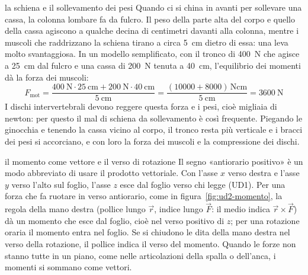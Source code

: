 

\begin{applicazione}{la schiena e il sollevamento dei pesi}
Quando ci si china in avanti per sollevare una cassa, la colonna lombare fa da fulcro. Il peso della parte alta del corpo e quello della cassa agiscono a qualche decina di centimetri davanti alla colonna, mentre i muscoli che raddrizzano la schiena tirano a circa \SI{5}{\centi\metre} dietro di essa: una leva molto svantaggiosa. In un modello semplificato, con il tronco di \SI{400}{\newton} che agisce a \SI{25}{\centi\metre} dal fulcro e una cassa di \SI{200}{\newton} tenuta a \SI{40}{\centi\metre}, l'equilibrio dei momenti dà la forza dei muscoli:
\[
  F_{\text{mot}} = \frac{\SI{400}{\newton} \cdot \SI{25}{\centi\metre} + \SI{200}{\newton} \cdot \SI{40}{\centi\metre}}{\SI{5}{\centi\metre}} = \frac{(10000 + 8000)\,\si{\newton\centi\metre}}{\SI{5}{\centi\metre}} = \SI{3600}{\newton}
\]
I dischi intervertebrali devono reggere questa forza e i pesi, cioè migliaia di newton: per questo il mal di schiena da sollevamento è così frequente. Piegando le ginocchia e tenendo la cassa vicino al corpo, il tronco resta più verticale e i bracci dei pesi si accorciano, e con loro la forza dei muscoli e la compressione dei dischi.
\end{applicazione}

\begin{approfondimento}{il momento come vettore e il verso di rotazione}
Il segno «antiorario positivo» è un modo abbreviato di usare il prodotto vettoriale. Con l'asse $x$ verso destra e l'asse $y$ verso l'alto sul foglio, l'asse $z$ esce dal foglio verso chi legge (UD1). Per una forza che fa ruotare in verso antiorario, come in figura~\ref{fig:ud2-momento}, la regola della mano destra (pollice lungo $\vec r$, indice lungo $\vec F$: il medio indica $\vec r \times \vec F$) dà un momento che esce dal foglio, cioè nel verso positivo di $z$; per una rotazione oraria il momento entra nel foglio. Se si chiudono le dita della mano destra nel verso della rotazione, il pollice indica il verso del momento. Quando le forze non stanno tutte in un piano, come nelle articolazioni della spalla o dell'anca, i momenti si sommano come vettori.
\end{approfondimento}

\riepilogoformule
